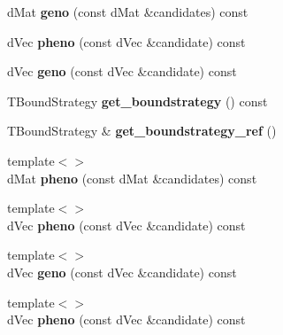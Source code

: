 \begin{DoxyCompactItemize}
\item 
\hypertarget{classlibcmaes_1_1GenoPheno_aa5b36c6f0b48806af87ce202b2427179}{d\-Mat {\bfseries geno} (const d\-Mat \&candidates) const }\label{classlibcmaes_1_1GenoPheno_aa5b36c6f0b48806af87ce202b2427179}

\item 
\hypertarget{classlibcmaes_1_1GenoPheno_adb90d40934c9eb6fd05eff7631734f46}{d\-Vec {\bfseries pheno} (const d\-Vec \&candidate) const }\label{classlibcmaes_1_1GenoPheno_adb90d40934c9eb6fd05eff7631734f46}

\item 
\hypertarget{classlibcmaes_1_1GenoPheno_a8a82e0e53e09403637f9f085b07fa08b}{d\-Vec {\bfseries geno} (const d\-Vec \&candidate) const }\label{classlibcmaes_1_1GenoPheno_a8a82e0e53e09403637f9f085b07fa08b}

\item 
\hypertarget{classlibcmaes_1_1GenoPheno_a40b42ee0fa775d76400e11d77f2ff651}{T\-Bound\-Strategy {\bfseries get\-\_\-boundstrategy} () const }\label{classlibcmaes_1_1GenoPheno_a40b42ee0fa775d76400e11d77f2ff651}

\item 
\hypertarget{classlibcmaes_1_1GenoPheno_a9b4ac739cd4ca680c3d14077e4e10bb4}{T\-Bound\-Strategy \& {\bfseries get\-\_\-boundstrategy\-\_\-ref} ()}\label{classlibcmaes_1_1GenoPheno_a9b4ac739cd4ca680c3d14077e4e10bb4}

\item 
\hypertarget{classlibcmaes_1_1GenoPheno_a3f4c3ea1900be14cb8fa11c306562790}{{\footnotesize template$<$$>$ }\\d\-Mat {\bfseries pheno} (const d\-Mat \&candidates) const}\label{classlibcmaes_1_1GenoPheno_a3f4c3ea1900be14cb8fa11c306562790}

\item 
\hypertarget{classlibcmaes_1_1GenoPheno_abab017b9d581575b81b2e0e09da86d64}{{\footnotesize template$<$$>$ }\\d\-Vec {\bfseries pheno} (const d\-Vec \&candidate) const}\label{classlibcmaes_1_1GenoPheno_abab017b9d581575b81b2e0e09da86d64}

\item 
\hypertarget{classlibcmaes_1_1GenoPheno_a5179951748808e74319482bc18c06af9}{{\footnotesize template$<$$>$ }\\d\-Vec {\bfseries geno} (const d\-Vec \&candidate) const}\label{classlibcmaes_1_1GenoPheno_a5179951748808e74319482bc18c06af9}

\item 
\hypertarget{classlibcmaes_1_1GenoPheno_acbd977770e9b0395a14951c5e05c4949}{{\footnotesize template$<$$>$ }\\d\-Vec {\bfseries pheno} (const d\-Vec \&candidate) const}\label{classlibcmaes_1_1GenoPheno_acbd977770e9b0395a14951c5e05c4949}


\end{DoxyCompactItemize}
